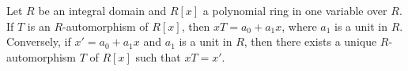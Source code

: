 Let $R$ be an integral domain and $R[x]$ a polynomial ring in one variable over $R$. If $T$ is an $R$-automorphism of $R[x]$, then $xT = a_0 + a_1 x$, where $a_1$ is a unit in $R$. Conversely, if $x' = a_0 + a_1 x$ and $a_1$ is a unit in $R$, then there exists a unique $R$-automorphism $T$ of $R[x]$ such that $xT = x'$.
